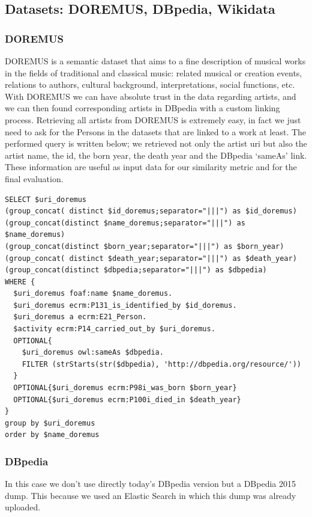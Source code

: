 \documentclass[paper=a4, fontsize=11pt]{scrartcl}
\begin{document}
\subsection{Datasets: DOREMUS, DBpedia, Wikidata}
\subsubsection{DOREMUS}
DOREMUS is a semantic dataset that aims to a fine description of musical works in the fields of traditional and classical music: related musical or creation events, relations to authors, cultural background, interpretations, social functions, etc.
With DOREMUS we can have absolute trust in the data regarding artists, and we can then found corresponding artists in DBpedia with a custom linking process.
Retrieving all artists from DOREMUS is extremely easy, in fact we just need to ask for the Persons in the datasets that are linked to a work at least. The performed query is written below; we retrieved not only the artist uri but also the artist name, the id, the born year, the death year and the DBpedia `sameAs' link. These information are useful as input data for our similarity metric and for the final evaluation.

\begin{lstlisting}
SELECT $uri_doremus
(group_concat( distinct $id_doremus;separator="|||") as $id_doremus)
(group_concat(distinct $name_doremus;separator="|||") as $name_doremus)
(group_concat(distinct $born_year;separator="|||") as $born_year)
(group_concat( distinct $death_year;separator="|||") as $death_year)
(group_concat(distinct $dbpedia;separator="|||") as $dbpedia)
WHERE {
  $uri_doremus foaf:name $name_doremus.
  $uri_doremus ecrm:P131_is_identified_by $id_doremus.
  $uri_doremus a ecrm:E21_Person.
  $activity ecrm:P14_carried_out_by $uri_doremus.
  OPTIONAL{
  	$uri_doremus owl:sameAs $dbpedia.
  	FILTER (strStarts(str($dbpedia), 'http://dbpedia.org/resource/'))
  }
  OPTIONAL{$uri_doremus ecrm:P98i_was_born $born_year}
  OPTIONAL{$uri_doremus ecrm:P100i_died_in $death_year}
}
group by $uri_doremus
order by $name_doremus
\end{lstlisting}

\subsubsection{DBpedia}
In this case we don't use directly today's DBpedia version but a DBpedia 2015 dump. This because we used an Elastic Search in which this dump was already uploaded.
\end{document}
